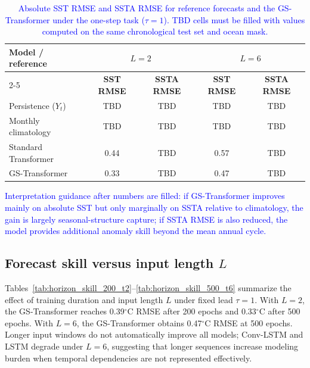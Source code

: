 \documentclass[published]{agujournal2025}
\newcommand{\rev}[1]{\textcolor{blue}{#1}}
\begin{document}
\begin{table}[h]
\caption{\rev{Absolute SST RMSE and SSTA RMSE for reference forecasts and the GS-Transformer under the one-step task ($\tau=1$). TBD cells must be filled with values computed on the same chronological test set and ocean mask.}}
\label{tab:ref_baselines}
\centering
\small
\renewcommand{\arraystretch}{1.8}
\begin{tabular}{lcccc}
\hline
\textbf{Model / reference} & \multicolumn{2}{c}{\textbf{$L=2$}} & \multicolumn{2}{c}{\textbf{$L=6$}} \\ \cline{2-5}
 & \textbf{SST RMSE} & \textbf{SSTA RMSE} & \textbf{SST RMSE} & \textbf{SSTA RMSE} \\ \hline
Persistence ($Y_t$) & TBD & TBD & TBD & TBD \\
Monthly climatology & TBD & TBD & TBD & TBD \\
Standard Transformer & 0.44 & TBD & 0.57 & TBD \\
GS-Transformer & 0.33 & TBD & 0.47 & TBD \\ \hline
\end{tabular}
\end{table}

\rev{Interpretation guidance after numbers are filled: if GS-Transformer improves mainly on absolute SST but only marginally on SSTA relative to climatology, the gain is largely seasonal-structure capture; if SSTA RMSE is also reduced, the model provides additional anomaly skill beyond the mean annual cycle.}

\subsection{Forecast skill versus input length $L$}
Tables~\ref{tab:horizon_skill_200_t2}--\ref{tab:horizon_skill_500_t6} summarize the effect of training duration and input length $L$ under fixed lead $\tau=1$. With $L=2$, the GS-Transformer reaches 0.39$^\circ$C RMSE after 200 epochs and 0.33$^\circ$C after 500 epochs. With $L=6$, the GS-Transformer obtains 0.47$^\circ$C RMSE at 500 epochs. Longer input windows do not automatically improve all models; Conv-LSTM and LSTM degrade under $L=6$, suggesting that longer sequences increase modeling burden when temporal dependencies are not represented effectively.
\end{document}
